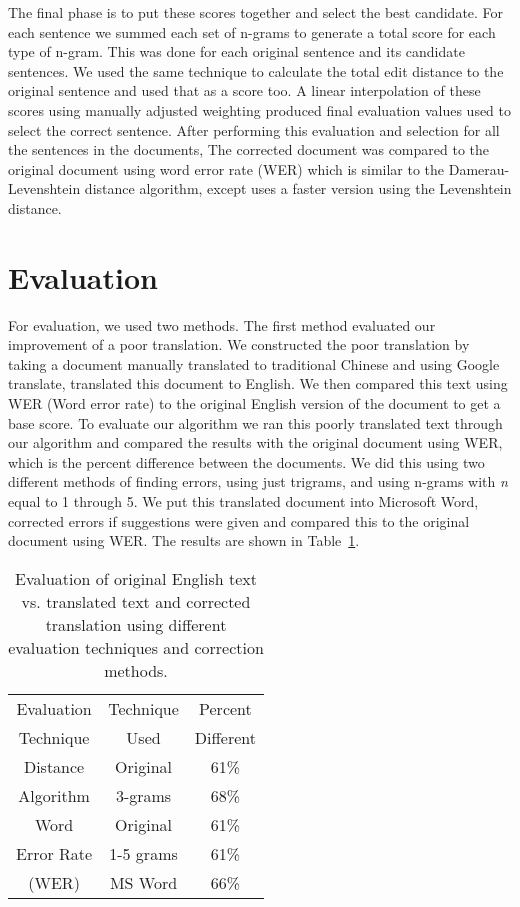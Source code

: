 \documentclass[twocolumn]{article}
\begin{document}
The final phase is to put these scores together and select the best candidate.
For each sentence we summed each set of n-grams to generate a total score for
each type of n-gram. This was done for each original sentence and its candidate
sentences. We used the same technique to calculate the total edit distance to
the original sentence and used that as a score too. A linear interpolation of
these scores using manually adjusted weighting produced final evaluation values
used to select the correct sentence. After performing this evaluation and
selection for all the sentences in the documents, The corrected document was
compared to the original document using word error rate (WER) which is similar to the Damerau-Levenshtein distance algorithm, except uses a faster version using the Levenshtein distance.

\section{Evaluation}
For evaluation, we used two methods. The first method evaluated our improvement
of a poor translation. We constructed the poor translation by taking a document
manually translated to traditional Chinese and using Google translate,
translated this document to English. We then compared this text using WER (Word
error rate) to the original English version of the document to get a base score.
To evaluate our algorithm we ran this poorly translated text through our
algorithm and compared the results with the original document using WER, which
is the percent difference between the documents. We did this using two different
methods of finding errors, using just trigrams, and using n-grams with \textit{n} equal
to 1 through 5. We put this translated document into Microsoft Word, corrected
errors if suggestions were given and compared this to the original document
using WER. The results are shown in Table~\ref{gpl}.

\begin{table}[h]
\centering
\begin{tabular}{ | c | c | c | }
\hline
Evaluation & Technique & Percent \\
Technique & Used & Different \\
\hline
Distance & Original & 61\% \\
\cline{2-3} Algorithm & 3-grams & 68\% \\
\hline
Word & Original & 61\% \\
\cline{2-3} Error Rate & 1-5 grams & 61\% \\
\cline{2-3} (WER) & MS Word & 66\% \\
\hline
\end{tabular}
\caption{Evaluation of original English text vs. translated text and corrected translation using different evaluation techniques and correction methods.}
\label{gpl}
\end{table}
\end{document}
